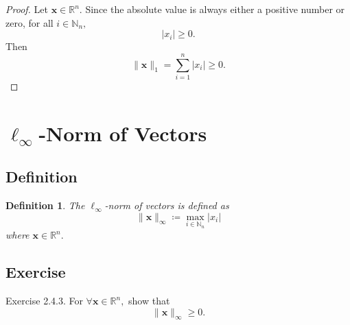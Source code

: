 \documentclass{article}
\theoremstyle{plain}
\newtheorem{dfn}{Definition}[subsection]
\begin{document}
\begin{proof}
  Let $\bm{x} \in \mathbb{R}^n .$
  Since the absolute value is always either a positive number or zero, for all $i \in \mathbb{N}_n ,$
  \begin{equation*}
    |x_i| \geq 0 .
  \end{equation*}
  Then
  \begin{equation*}
    \lVert \bm{x} \rVert_1 = \sum_{i=1}^n |x_i| \geq 0 .
  \end{equation*}
\end{proof}


\section{$\ell_\infty$-Norm of Vectors}

\subsection{Definition}

\begin{dfn}
  The $\ell_\infty$-norm of vectors is defined as
  \begin{equation}
    \label{def_l_inf}
    \lVert \bm{x} \rVert_\infty \coloneq \max_{i \in \mathbb{N}_n} |x_i|
  \end{equation}
  where
  \begin{math}
    \bm{x} \in \mathbb{R}^n .
  \end{math}
\end{dfn}

\subsection{Exercise}

\begin{itembox}[l]{Exercise 2.4.3.}
  For
  \begin{math}
    \forall \bm{x} \in \mathbb{R}^n ,
  \end{math}
  show that
  \begin{equation}
    \label{ex243}
    \lVert \bm{x} \rVert_\infty \geq 0 .
  \end{equation}
\end{itembox}
\end{document}
